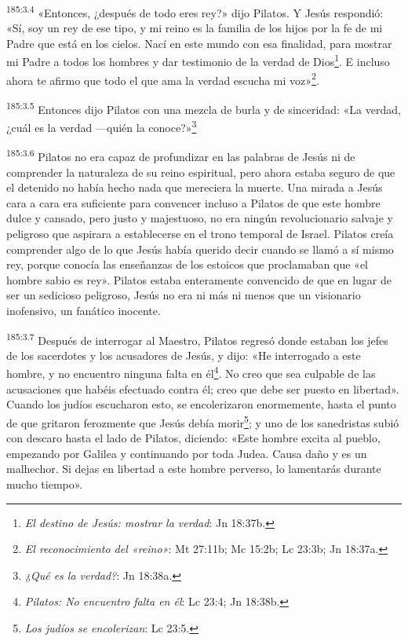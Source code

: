 \par 
\textsuperscript{185:3.4} «Entonces, ¿después de todo eres rey?» dijo Pilatos. Y Jesús respondió: «Sí, soy un rey de ese tipo, y mi reino es la familia de los hijos por la fe de mi Padre que está en los cielos. Nací en este mundo con esa finalidad, para mostrar mi Padre a todos los hombres y dar testimonio de la verdad de Dios\footnote{\textit{El destino de Jesús: mostrar la verdad}: Jn 18:37b.}. E incluso ahora te afirmo que todo el que ama la verdad escucha mi voz»\footnote{\textit{El reconocimiento del «reino»}: Mt 27:11b; Mc 15:2b; Lc 23:3b; Jn 18:37a.}.

\par 
\textsuperscript{185:3.5} Entonces dijo Pilatos con una mezcla de burla y de sinceridad: «La verdad, ¿cuál es la verdad ---quién la conoce?»\footnote{\textit{¿Qué es la verdad?}: Jn 18:38a.}

\par 
\textsuperscript{185:3.6} Pilatos no era capaz de profundizar en las palabras de Jesús ni de comprender la naturaleza de su reino espiritual, pero ahora estaba seguro de que el detenido no había hecho nada que mereciera la muerte. Una mirada a Jesús cara a cara era suficiente para convencer incluso a Pilatos de que este hombre dulce y cansado, pero justo y majestuoso, no era ningún revolucionario salvaje y peligroso que aspirara a establecerse en el trono temporal de Israel. Pilatos creía comprender algo de lo que Jesús había querido decir cuando se llamó a sí mismo rey, porque conocía las enseñanzas de los estoicos que proclamaban que «el hombre sabio es rey». Pilatos estaba enteramente convencido de que en lugar de ser un sedicioso peligroso, Jesús no era ni más ni menos que un visionario inofensivo, un fanático inocente.

\par 
\textsuperscript{185:3.7} Después de interrogar al Maestro, Pilatos regresó donde estaban los jefes de los sacerdotes y los acusadores de Jesús, y dijo: «He interrogado a este hombre, y no encuentro ninguna falta en él\footnote{\textit{Pilatos: No encuentro falta en él}: Lc 23:4; Jn 18:38b.}. No creo que sea culpable de las acusaciones que habéis efectuado contra él; creo que debe ser puesto en libertad». Cuando los judíos escucharon esto, se encolerizaron enormemente, hasta el punto de que gritaron ferozmente que Jesús debía morir\footnote{\textit{Los judíos se encolerizan}: Lc 23:5.}; y uno de los sanedristas subió con descaro hasta el lado de Pilatos, diciendo: «Este hombre excita al pueblo, empezando por Galilea y continuando por toda Judea. Causa daño y es un malhechor. Si dejas en libertad a este hombre perverso, lo lamentarás durante mucho tiempo».

